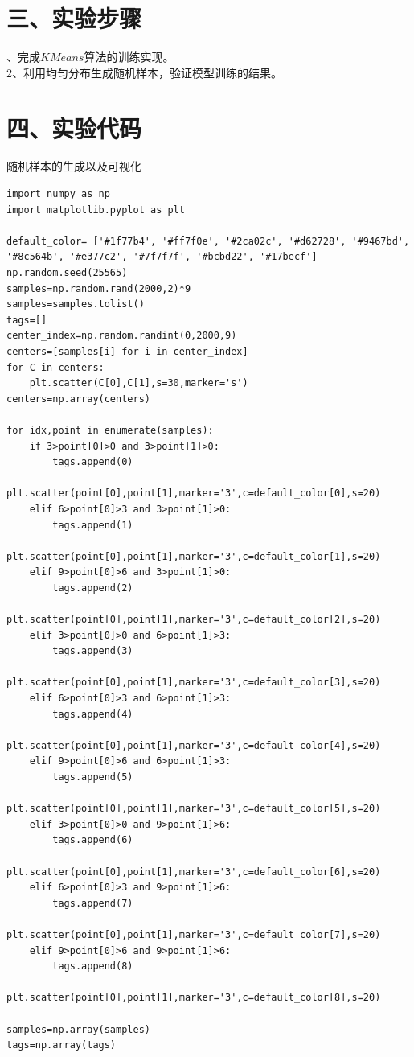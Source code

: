 \documentclass{article}
\begin{document}
\section*{\LARGE 三、实验步骤}、完成$KMeans$算法的训练实现。\\
2、利用均匀分布生成随机样本，验证模型训练的结果。

\section*{\LARGE 四、实验代码}
\noindent 随机样本的生成以及可视化
\begin{verbatim}
import numpy as np
import matplotlib.pyplot as plt

default_color= ['#1f77b4', '#ff7f0e', '#2ca02c', '#d62728', '#9467bd', '#8c564b', '#e377c2', '#7f7f7f', '#bcbd22', '#17becf']
np.random.seed(25565)
samples=np.random.rand(2000,2)*9
samples=samples.tolist()
tags=[]
center_index=np.random.randint(0,2000,9)
centers=[samples[i] for i in center_index]
for C in centers:
    plt.scatter(C[0],C[1],s=30,marker='s')
centers=np.array(centers)

for idx,point in enumerate(samples):
    if 3>point[0]>0 and 3>point[1]>0:
        tags.append(0)
        plt.scatter(point[0],point[1],marker='3',c=default_color[0],s=20)
    elif 6>point[0]>3 and 3>point[1]>0:
        tags.append(1)
        plt.scatter(point[0],point[1],marker='3',c=default_color[1],s=20)
    elif 9>point[0]>6 and 3>point[1]>0:
        tags.append(2)
        plt.scatter(point[0],point[1],marker='3',c=default_color[2],s=20)
    elif 3>point[0]>0 and 6>point[1]>3:
        tags.append(3)
        plt.scatter(point[0],point[1],marker='3',c=default_color[3],s=20)
    elif 6>point[0]>3 and 6>point[1]>3:
        tags.append(4)
        plt.scatter(point[0],point[1],marker='3',c=default_color[4],s=20)
    elif 9>point[0]>6 and 6>point[1]>3:
        tags.append(5)
        plt.scatter(point[0],point[1],marker='3',c=default_color[5],s=20)
    elif 3>point[0]>0 and 9>point[1]>6:
        tags.append(6)
        plt.scatter(point[0],point[1],marker='3',c=default_color[6],s=20)
    elif 6>point[0]>3 and 9>point[1]>6:
        tags.append(7)
        plt.scatter(point[0],point[1],marker='3',c=default_color[7],s=20)
    elif 9>point[0]>6 and 9>point[1]>6:
        tags.append(8)
        plt.scatter(point[0],point[1],marker='3',c=default_color[8],s=20)

samples=np.array(samples)
tags=np.array(tags)
\end{verbatim}
\end{document}
